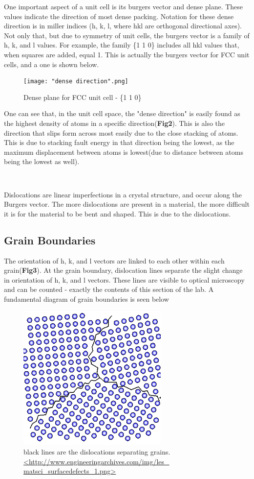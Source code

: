 \documentclass{article}
\begin{document}
One important aspect of a unit cell is its burgers vector and dense plane. These values indicate the direction of most dense packing. Notation for these dense direction is in miller indices (h, k, l, where hkl are orthogonal directional axes). Not only that, but due to symmetry of unit cells, the burgers vector is a family of h, k, and l values. For example, the family \{1 1 0\} includes all hkl values that, when squares are added, equal 1. This is actually the burgers vector for FCC unit cells, and a one is shown below.

\begin{figure}[h]
	\centering
	\texttt{[image: "dense direction".png]}
	\caption{Dense plane for FCC unit cell - \{1 1 0\}}
\end{figure}

One can see that, in the unit cell space, the "dense direction" is easily found as the highest density of atoms in a specific direction(\textbf{Fig2}). This is also the direction that slips form across most easily due to the close stacking of atoms. This is due to stacking fault energy in that direction being the lowest, as the maximum displacement between atoms is lowest(due to distance between atoms being the lowest as well).

\ 

Dislocations are linear imperfections in a crystal structure, and occur along the Burgers vector. The more dislocations are present in a material, the more difficult it is for the material to be bent and shaped. This is due to the dislocations.

\subsection{Grain Boundaries} 

The orientation of h, k, and l vectors are linked to each other within each grain(\textbf{Fig3}). At the grain boundary, dislocation lines separate the slight change in orientation of h, k, and l vectors. These lines are visible to optical microscopy and can be counted - exactly the contents of this section of the lab. A fundamental diagram of grain boundaries is seen below

\begin{figure}[h]
	\centering
	\includegraphics[scale=.6]{grain.png}
	\caption{black lines are the dislocations separating grains. \url{<http://www.engineeringarchives.com/img/les\_ matsci_surfacedefects_1.png>}}
\end{figure}
\ \\[1.35in]
\end{document}
